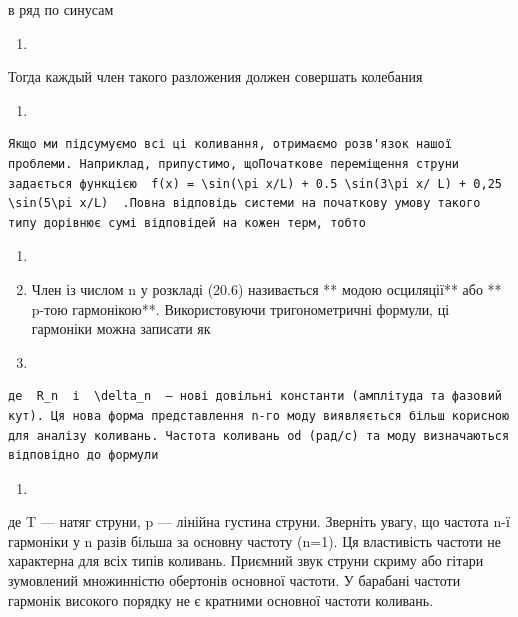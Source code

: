 \documentclass[
  ukrainian,
]{article}
\providecommand{\tightlist}{%
  \setlength{\itemsep}{0pt}\setlength{\parskip}{0pt}}
\begin{document}
в ряд по синусам

\begin{enumerate}
\def\labelenumi{\arabic{enumi}.}
\setcounter{enumi}{15}
\tightlist
\item
\end{enumerate}

Тогда каждый член такого разложения должен совершать колебания

\begin{enumerate}
\def\labelenumi{\arabic{enumi}.}
\setcounter{enumi}{16}
\tightlist
\item
\end{enumerate}

\begin{verbatim}
Якщо ми підсумуємо всі ці коливання, отримаємо розв'язок нашої проблеми. Наприклад, припустимо, щоПочаткове переміщення струни задається функцією  f(x) = \sin(\pi x/L) + 0.5 \sin(3\pi x/ L) + 0,25 \sin(5\pi x/L)  .Повна відповідь системи на початкову умову такого типу дорівнює сумі відповідей на кожен терм, тобто
\end{verbatim}

\begin{enumerate}
\def\labelenumi{\arabic{enumi}.}
\setcounter{enumi}{17}
\item
\item
  Член із числом n у розкладі (20.6) називається ** модою осциляції**
  або ** p-тою гармонікою**. Використовуючи тригонометричні формули, ці
  гармоніки можна записати як
\item
\end{enumerate}

\begin{verbatim}
де  R_n  і  \delta_n  — нові довільні константи (амплітуда та фазовий кут). Ця нова форма представлення n-го моду виявляється більш корисною для аналізу коливань. Частота коливань od (рад/с) та моду визначаються відповідно до формули
\end{verbatim}

\begin{enumerate}
\def\labelenumi{\arabic{enumi}.}
\setcounter{enumi}{9}
\tightlist
\item
\end{enumerate}

де T --- натяг струни, p --- лінійна густина струни. Зверніть увагу, що
частота n-ї гармоніки у n разів більша за основну частоту (n=1). Ця
властивість частоти не характерна для всіх типів коливань. Приємний звук
струни скриму або гітари зумовлений множинністю обертонів основної
частоти. У барабані частоти гармонік високого порядку не є кратними
основної частоти коливань.
\end{document}
